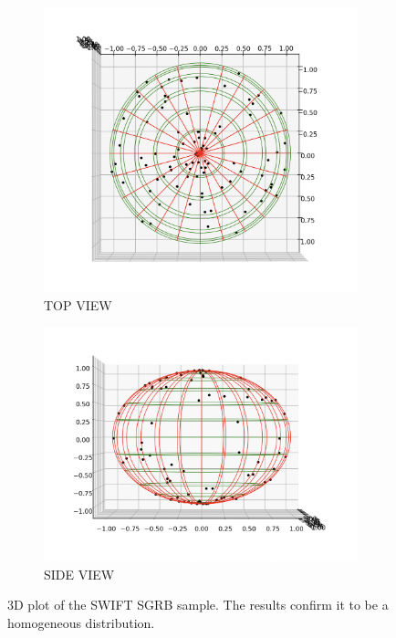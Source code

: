 \documentclass[12pt]{article}
\begin{document}
\begin{figure}[h]
  \begin{subfigure}{.5\textwidth}
  \centering
    \includegraphics[width=1\linewidth]{SWIFT SGRB 3D.png}
    \caption{TOP VIEW}
  \end{subfigure}%
  \begin{subfigure}{.5\textwidth}
  \centering
    \includegraphics[width=1\linewidth]{SWIFT SGRB 3DD.png}
    \caption{SIDE VIEW}
  \end{subfigure}
  \caption{3D plot of the SWIFT SGRB sample. The results confirm it to be a homogeneous distribution.}
\end{figure}
\end{document}
